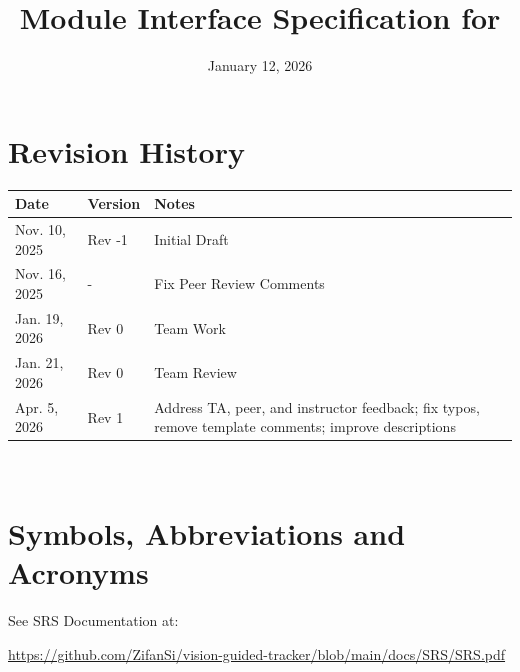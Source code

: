 \documentclass[12pt, titlepage]{article}
\begin{document}
\title{Module Interface Specification for \progname{}}

\author{\authname}

\date{January 12, 2026}

\maketitle


\section{Revision History}

\begin{tabularx}{\textwidth}{p{3cm}p{2cm}X}
  \toprule {\bf Date} & {\bf Version} & {\bf Notes}                                           \\
  \midrule
  Nov. 10, 2025       & Rev -1        & Initial Draft                                         \\
  Nov. 16, 2025       & -             & Fix Peer Review Comments                              \\
  Jan. 19, 2026       & Rev 0         & Team Work                                             \\
  Jan. 21, 2026       & Rev 0         & Team Review                                           \\
  Apr. 5, 2026        & Rev 1         & Address TA, peer, and instructor feedback; fix typos,
  remove template comments; improve descriptions                                              \\
  \bottomrule
\end{tabularx}

~\newpage

\section{Symbols, Abbreviations and Acronyms}

See SRS Documentation at:

\href{https://github.com/ZifanSi/vision-guided-tracker/blob/main/docs/SRS/SRS.pdf}{https://github.com/ZifanSi/vision-guided-tracker/blob/main/docs/SRS/SRS.pdf}
\end{document}
